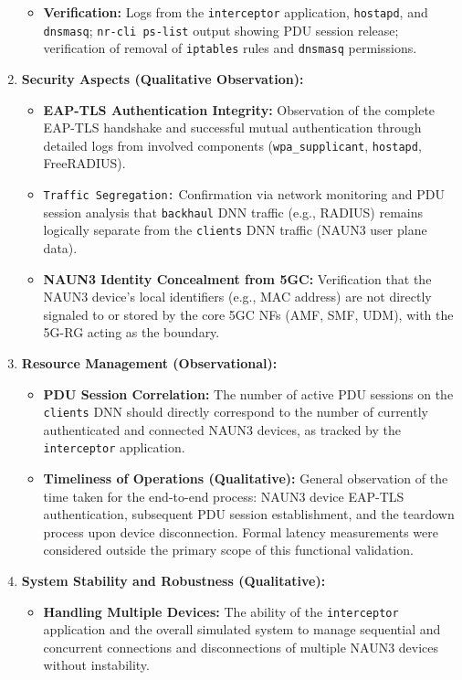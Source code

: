 \begin{enumerate}
{\begin{itemize}
{\begin{itemize}
                    \item \textbf{Verification:} Logs from the \texttt{interceptor} application, \texttt{hostapd}, and \texttt{dnsmasq}; \texttt{nr-cli ps-list} output showing \ac{PDU} session release; verification of removal of \texttt{iptables} rules and \texttt{dnsmasq} permissions.
                \end{itemize}
            }
        \end{itemize}
    }
    \item{
        \textbf{Security Aspects (Qualitative Observation):}
        \begin{itemize}
            \item \textbf{\ac{EAP-TLS} Authentication Integrity:} Observation of the complete \ac{EAP-TLS} handshake and successful mutual authentication through detailed logs from involved components (\texttt{wpa\_supplicant}, \texttt{hostapd}, FreeRADIUS).

            \item \texttt{Traffic Segregation:} Confirmation via network monitoring and \ac{PDU} session analysis that \texttt{backhaul} \ac{DNN} traffic (e.g., \ac{RADIUS}) remains logically separate from the \texttt{clients} \ac{DNN} traffic (\ac{NAUN3} user plane data).

            \item \textbf{\ac{NAUN3} Identity Concealment from \ac{5GC}:} Verification that the \ac{NAUN3} device's local identifiers (e.g., \ac{MAC} address) are not directly signaled to or stored by the core \ac{5GC} \acp{NF} (\ac{AMF}, \ac{SMF}, \ac{UDM}), with the \ac{5G-RG} acting as the boundary.
        \end{itemize}
    }
    \item{
        \textbf{Resource Management (Observational):}
        \begin{itemize}
            \item \textbf{\ac{PDU} Session Correlation:} The number of active \ac{PDU} sessions on the \texttt{clients} \ac{DNN} should directly correspond to the number of currently authenticated and connected \ac{NAUN3} devices, as tracked by the \texttt{interceptor} application.

            \item \textbf{Timeliness of Operations (Qualitative):} General observation of the time taken for the end-to-end process: \ac{NAUN3} device \ac{EAP-TLS} authentication, subsequent \ac{PDU} session establishment, and the teardown process upon device disconnection. Formal latency measurements were considered outside the primary scope of this functional validation.
        \end{itemize}
    }
    \item{
        \textbf{System Stability and Robustness (Qualitative):}
        \begin{itemize}
            \item \textbf{Handling Multiple Devices:} The ability of the \texttt{interceptor} application and the overall simulated system to manage sequential and concurrent connections and disconnections of multiple \ac{NAUN3} devices without instability.


\end{itemize}}
\end{enumerate}
